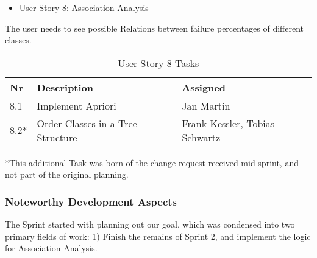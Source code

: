 \newpage
\begin{itemize}
	\item User Story 8: Association Analysis
	\end{itemize}
The user needs to see possible Relations between failure percentages of different classes.
\begin{table}[h]
  \caption{User Story 8 Tasks}
  \label{Story 8 Tasks}
  \centering
  \begin{tabular}{p{1cm}|p{5cm}|p{3cm}|}
  	Nr & Description & Assigned \\ 
  	\hline
  	8.1 & Implement Apriori & Jan Martin \\ 
  	\hline
  	8.2* & Order Classes in a Tree Structure & Frank Kessler, Tobias Schwartz \\ 
  	\hline
  \end{tabular}
\end{table}
*This additional Task was born of the change request received mid-sprint, and not part of the original planning.




\subsubsection*{Noteworthy Development Aspects}

The Sprint started with planning out our goal, which was condensed into two primary fields of work: 1) Finish the remains of Sprint 2, and implement the logic for Association Analysis. 


